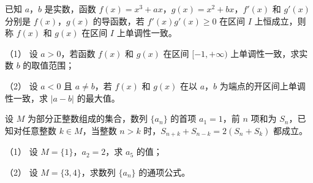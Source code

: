 \begin{question}
已知 $a$，$b$ 是实数，函数 $f(x)=x^3+ax$，$g(x)=x^2+bx$，$f'(x)$ 和 $g'(x)$ 分别是 $f(x)$，$g(x)$ 的导函数，若 $f'(x)g'(x)\geqslant0$ 在区间 $I$ 上恒成立，则称 $f(x)$ 和 $g(x)$ 在区间 $I$ 上单调性一致。

（1） 设 $a>0$，若函数 $f(x)$ 和 $g(x)$ 在区间 $[-1,+\infty)$ 上单调性一致，求实数 $b$ 的取值范围；

（2） 设 $a<0$ 且 $a\neq b$，若 $f(x)$ 和 $g(x)$ 在以 $a$，$b$ 为端点的开区间上单调性一致，求 $|a-b|$ 的最大值。

\end{question}
\begin{question}
设 $M$ 为部分正整数组成的集合，数列 $\{a_n\}$ 的首项 $a_1=1$，前 $n$ 项和为 $S_n$，已知对任意整数 $k\in M$，当整数 $n>k$ 时，$S_{n+k}+S_{n-k}=2(S_n+S_k)$ 都成立。

（1） 设 $M=\{1\}$，$a_2=2$，求 $a_5$ 的值；

（2） 设 $M=\{3,4\}$，求数列 $\{a_n\}$ 的通项公式。

\end{question}

